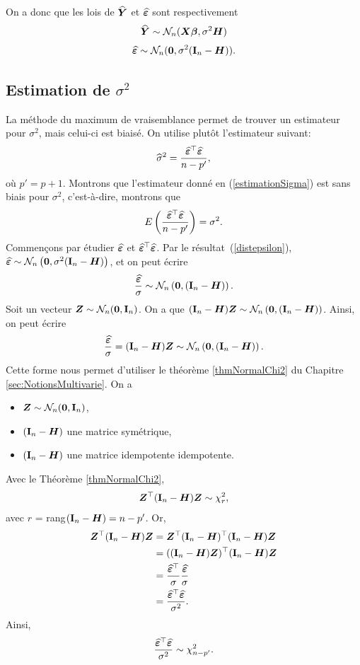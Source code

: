 On a donc que les lois de $\widehat{\bm{Y}}$ et $\widehat{\bm\varepsilon}$ sont respectivement
\begin{eqnarray*}
	\widehat{\bm{Y}} \sim \mathcal{N}_n(\bm{X}\bm\beta, \sigma^2\bm{H})
\end{eqnarray*}
\begin{eqnarray}
	\widehat{\bm\varepsilon} \sim \mathcal{N}_n(\bold{0}, \sigma^2(\bold{I}_n-\bm{H})).
	\label{distepsilon}
\end{eqnarray}


\subsection{Estimation de $\sigma^2$}
\label{sec:RLM-sigma}

La méthode du maximum de vraisemblance permet de trouver un estimateur pour $\sigma^2$, mais celui-ci est biaisé. On utilise plutôt l'estimateur suivant:
\begin{eqnarray}
	\widehat{\sigma}^2=\frac{\widehat{\bm\varepsilon}^\top\widehat{\bm\varepsilon}}{n-p'},
	\label{estimationSigma}
\end{eqnarray}
où $p'=p+1$.
Montrons que l'estimateur donné en (\ref{estimationSigma}) est sans biais pour $\sigma^2$, c'est-à-dire, montrons que
$$ E \left( \frac{\widehat{\bm\varepsilon}^\top\widehat{\bm\varepsilon}}{n-p'} \right) = \sigma^2. $$
Commençons par étudier $\widehat{\bm\varepsilon}$ et $\widehat{\bm\varepsilon}^\top\widehat{\bm\varepsilon}$.
Par  le résultat~(\ref{distepsilon}), $\widehat{\bm\varepsilon} \sim \mathcal{N}_n\left(\bold{0}, \sigma^2(\bold{I}_n-\bm{H})\right)$, et on peut écrire
$$ \frac{\widehat{\bm\varepsilon}}{\sigma} \sim \mathcal{N}_n\left(\bold{0}, (\bold{I}_n-\bm{H})\right).$$
Soit un vecteur ${\bm{Z}} \sim \mathcal{N}_n({\bm{0}}, \bold{I}_n)$. On a que $(\bold{I}_n - \bm{H}){\bm{Z}} \sim \mathcal{N}_n\left(\bold{0}, (\bold{I}_n-\bm{H})\right)$. Ainsi, on peut écrire 
$$ \frac{\widehat{\bm\varepsilon}}{\sigma} = (\bold{I}_n - \bm{H}){\bm{Z}} \sim \mathcal{N}_n\left(\bold{0}, (\bold{I}_n-\bm{H})\right).$$
Cette forme nous permet d'utiliser le théorème \ref{thmNormalChi2} du Chapitre \ref{sec:NotionsMultivarie}. On a 
\begin{itemize}
\item[$\bullet$] ${\bm{Z}} \sim \mathcal{N}_n({\bm{0}},\bold{I}_n)$,
\item[$\bullet$] $(\bold{I}_n-\bm{H})$ une matrice symétrique,
\item[$\bullet$] $(\bold{I}_n-\bm{H})$ une matrice idempotente idempotente.
\end{itemize}
Avec le Théorème \ref{thmNormalChi2},
$$ {\bm{Z}}^\top(\bold{I}_n-\bm{H}) {\bm{Z}} \sim \chi^2_r,$$
avec $r$ = rang$(\bold{I}_n-\bm{H}) = n-p'$. 
Or,
\begin{align*}
{\bm{Z}}^\top(\bold{I}_n-\bm{H}) {\bm{Z}} &= {\bm{Z}}^\top(\bold{I}_n-\bm{H})^\top(\bold{I}_n-\bm{H}) {\bm{Z}} \\
&= ((\bold{I}_n-\bm{H}){\bm{Z}})^\top (\bold{I}_n-\bm{H}) {\bm{Z}} \\
&= \frac{\widehat{\bm\varepsilon}^\top}{\sigma} \frac{\widehat{\bm\varepsilon}}{\sigma} \\
&= \frac{\widehat{\bm\varepsilon}^\top\widehat{\bm\varepsilon}}{\sigma^2}.
\end{align*}
Ainsi,
$$ \frac{\widehat{\bm\varepsilon}^\top\widehat{\bm\varepsilon}}{\sigma^2} \sim \chi^2_{n-p'}.$$


